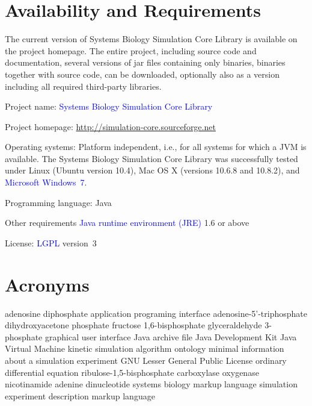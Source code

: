 \documentclass[10pt]{bmc_article}
\newenvironment{bmcformat}{\fussy\setboolean{publ}{true}}{\fussy}
\newcommand{\COR}[1]{\textcolor{blue}{#1}}
\begin{document}
\begin{bmcformat}
\section*{Availability and Requirements}
The current version of Systems Biology Simulation Core Library is available on the project homepage. The entire project, including source code and documentation, several versions of jar files containing only binaries, binaries together with source code, can be downloaded, optionally also as a version including all required third-party libraries.
\begin{description}
  \item{Project name:}         \COR{Systems Biology Simulation Core Library}
  \item{Project homepage:}     \COR{\url{http://simulation-core.sourceforge.net}}
  \item{Operating systems:}    Platform independent, i.e., for all systems for which a JVM
    is available. The Systems Biology Simulation Core Library was successfully 
    tested under Linux (Ubuntu version 10.4), Mac OS X (versions 10.6.8 and 10.8.2),
    and \COR{Microsoft\textsuperscript{\textregistered} Windows\textsuperscript{\textregistered}~7}.
  \item{Programming language:} Java\texttrademark
  \item{Other requirements}    \COR{Java runtime environment (JRE)} 1.6 or above
  \item{License:}              \COR{\acf{LGPL}} version~3
\end{description}

\section*{Acronyms}
\begin{acronym}
         {adenosine diphosphate}
         {application programing interface}
         {adenosine-5'-triphosphate}
        {dihydroxyacetone phosphate}
      {fructose 1,6-bisphosphate}
        {glyceraldehyde 3-phosphate}
         {graphical user interface}
         {Java archive file}
         {Java Development Kit}
         {Java Virtual Machine}
       {kinetic simulation algorithm ontology}
       {minimal information about a simulation experiment}
        {GNU Lesser General Public License}
         {ordinary differential equation}
     {ribulose-1,5-bisphosphate carboxylase oxygenase}
     {nicotinamide adenine dinucleotide}
        {systems biology markup language}
      {simulation experiment description markup language}
\end{acronym}


\end{bmcformat}
\end{document}
